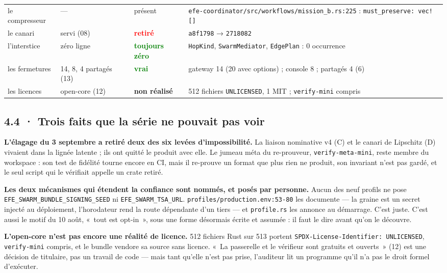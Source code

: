 \documentclass[10pt]{article}
\newcommand{\code}[1]{\texttt{\small #1}}
\newcommand{\loc}[1]{{\footnotesize\color{grey}\texttt{#1}}}
\newcommand{\ok}[1]{\textcolor{green}{\textbf{#1}}}
\newcommand{\ko}[1]{\textcolor{red}{\textbf{#1}}}
\newcommand{\att}[1]{\textcolor{amber}{\textbf{#1}}}
\begin{document}
{\begin{longtable}{@{}L{3.3cm}L{4.2cm}L{2.2cm}L{7.0cm}@{}}
le compresseur & --- & présent & \loc{efe-coordinator/src/workflows/mission\_b.rs:225} : \code{must\_preserve: vec![]} \\
le canari & servi (08) & \ko{retiré} & \code{a8f1798} → \code{2718082} \\
l'interstice & zéro ligne & \ok{toujours zéro} & \code{HopKind}, \code{SwarmMediator}, \code{EdgePlan} : 0 occurrence \\
les fermetures & 14, 8, 4 partagés (13) & \ok{vrai} & gateway 14 (20 avec options) ; console 8 ; partagés 4 (6) \\
les licences & open-core (12) & \att{non réalisé} & 512 fichiers \code{UNLICENSED}, 1 MIT ; \code{verify-mini} compris \\
\bottomrule
\end{longtable}
}

\subsection{4.4 · Trois faits que la série ne pouvait pas voir}

\textbf{L'élagage du 3 septembre a retiré deux des six levées d'impossibilité.} La liaison nominative v4 (C) et le
canari de Lipschitz (D) vivaient dans la lignée latente ; ils ont quitté le produit avec elle. Le jumeau méta du
re-prouveur, \code{verify-meta-mini}, reste membre du workspace : son test de fidélité tourne encore en CI, mais il
re-prouve un format que plus rien ne produit, son invariant n'est pas gardé, et le seul script qui le vérifiait
appelle un crate retiré.

\textbf{Les deux mécanismes qui étendent la confiance sont nommés, et posés par personne.} Aucun des neuf profils ne
pose \code{EFE\_SWARM\_BUNDLE\_SIGNING\_SEED} ni \code{EFE\_SWARM\_TSA\_URL}. \loc{profiles/production.env:53-80} les
documente --- la graine est un secret injecté au déploiement, l'horodateur rend la route dépendante d'un tiers ---
et \code{profile.rs} les annonce au démarrage. C'est juste. C'est aussi le motif du 10 août, «~tout est opt-in~»,
sous une forme désormais écrite et assumée : il faut le dire avant qu'on le découvre.

\textbf{L'open-core n'est pas encore une réalité de licence.} 512 fichiers Rust sur 513 portent
\code{SPDX-License-Identifier: UNLICENSED}, \code{verify-mini} compris, et le bundle vendore sa source sans licence.
«~La passerelle et le vérifieur sont gratuits et ouverts~» (12) est une décision de titulaire, pas un travail de
code --- mais tant qu'elle n'est pas prise, l'auditeur lit un programme qu'il n'a pas le droit formel d'exécuter.
\end{document}
